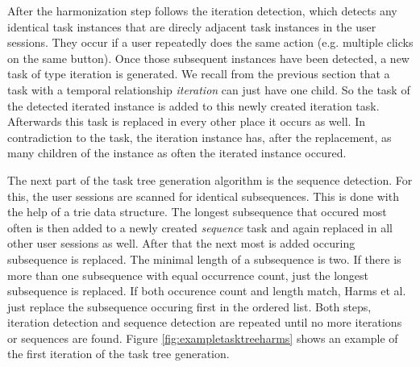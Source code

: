 After the harmonization step follows the iteration detection, which detects any identical task instances that are direcly adjacent task instances in the user sessions. They occur if a user repeatedly does the same action (e.g. multiple clicks on the same button). 
Once those subsequent instances have been detected, a new task of type iteration is generated. 
We recall from the previous section that a task with a temporal relationship \textit{iteration} can just have one child. So the task of the detected iterated instance is added to this newly created iteration task.
Afterwards this task is replaced in every other place it occurs as well. 
In contradiction to the task, the iteration instance has, after the replacement, as many children of the instance as often the iterated instance occured.

The next part of the task tree generation algorithm is the sequence detection.
For this, the user sessions are scanned for identical subsequences. This is done with the help of a trie data structure.
The longest subsequence that occured most often is then added to a newly created \textit{sequence} task and again replaced in
all other user sessions as well. After that the next most is added occuring subsequence is replaced. The minimal length of a subsequence is two.
If there is more than one subsequence with equal occurrence count, just the longest subsequence is replaced.
If both occurence count and length match, Harms et al. just replace the subsequence occuring first in the ordered list.
Both steps, iteration detection and sequence detection are repeated until no more iterations or sequences are found.
Figure \ref{fig:exampletasktreeharms} shows an example of the first iteration of the task tree generation.

